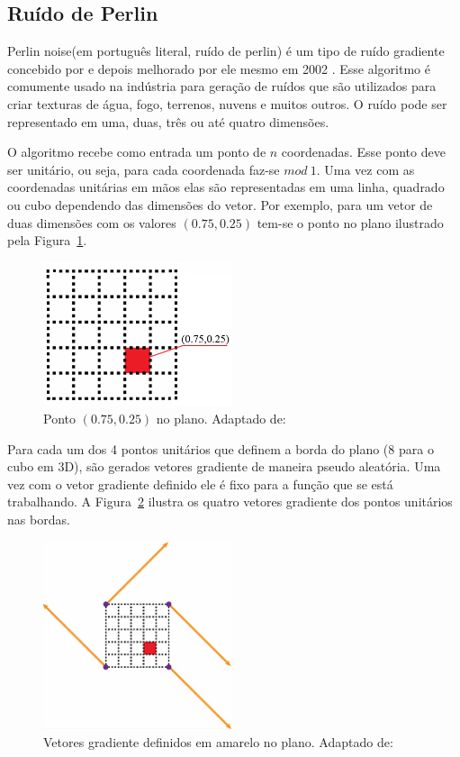 \documentclass[12pt, 
openright, 
oneside, 
a4paper,    
brazil]{facom-ufu-abntex2}
\begin{document}
\subsection{Ruído de Perlin}
Perlin noise(em português literal, ruído de perlin) é um tipo de ruído gradiente concebido por  e depois melhorado por ele mesmo em 2002 \cite{Perlin:2002:IN:566654.566636}. Esse algoritmo é comumente usado na indústria para geração de ruídos que são utilizados para criar texturas de água, fogo, terrenos, nuvens e muitos outros. O ruído pode ser representado em uma, duas, três ou até quatro dimensões.

O algoritmo recebe como entrada um ponto de $n$ coordenadas. Esse ponto deve ser unitário, ou seja, para cada coordenada faz-se $ mod~1$. Uma vez com as coordenadas unitárias em mãos elas são representadas em uma linha, quadrado ou cubo dependendo das dimensões do vetor. Por exemplo, para um vetor de duas dimensões com os valores $(0.75, 0.25)$ tem-se o ponto no plano ilustrado pela Figura~\ref{fig:perlinPoint}.

\begin{figure}[H]
	\centering
	\includegraphics[width=15em]{imagens/perlinPoint.png}
	\caption{Ponto $(0.75, 0.25)$ no plano. Adaptado de: \cite{Fataho}}
	\label{fig:perlinPoint}
\end{figure}

Para cada um dos 4 pontos unitários que definem a borda do plano (8 para o cubo em 3D), são gerados vetores gradiente de maneira pseudo aleatória. Uma vez com o vetor gradiente definido ele é fixo para a função que se está trabalhando. A Figura~\ref{fig:perlinGradients} ilustra os quatro vetores gradiente dos pontos unitários nas bordas.

\begin{figure}[H]
	\centering
	\includegraphics[width=15em]{imagens/perlinGradients.png}
	\caption{Vetores gradiente definidos em amarelo no plano. Adaptado de: \cite{Fataho}}
	\label{fig:perlinGradients}
\end{figure}
\end{document}
